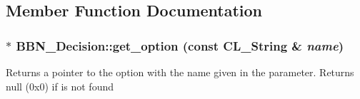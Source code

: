 \subsection{Member Function Documentation}
\hypertarget{classBBN__Decision_a1e6a97fe500472d9ac2cffbb760e6f64}{
\subsubsection[{get\_\-option}]{ $\ast$ BBN\_\-Decision::get\_\-option (const CL\_\-String \& {\em name})}}
\label{classBBN__Decision_a1e6a97fe500472d9ac2cffbb760e6f64}
Returns a pointer to the option with the name given in the parameter. Returns null (0x0) if is not found

